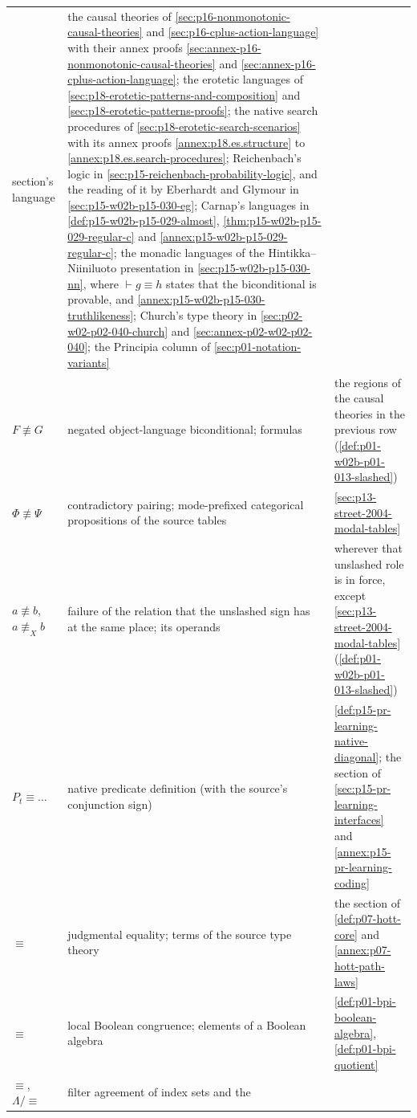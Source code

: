 \begin{longtable}{@{}p{}p{}p{}@{}}
section's language & the causal theories of
\cref{sec:p16-nonmonotonic-causal-theories} and
\cref{sec:p16-cplus-action-language} with their annex proofs
\cref{sec:annex-p16-nonmonotonic-causal-theories} and
\cref{sec:annex-p16-cplus-action-language}; the erotetic languages of
\cref{sec:p18-erotetic-patterns-and-composition} and
\cref{sec:p18-erotetic-patterns-proofs}; the native search procedures of
\cref{sec:p18-erotetic-search-scenarios} with its annex proofs
\cref{annex:p18.es.structure} to \cref{annex:p18.es.search-procedures};
Reichenbach's logic in \cref{sec:p15-reichenbach-probability-logic}, and
the reading of it by Eberhardt and Glymour in \cref{sec:p15-w02b-p15-030-eg};
Carnap's languages in \cref{def:p15-w02b-p15-029-almost},
\cref{thm:p15-w02b-p15-029-regular-c} and
\cref{annex:p15-w02b-p15-029-regular-c}; the monadic languages of the
Hintikka--Niiniluoto presentation in \cref{sec:p15-w02b-p15-030-nn}, where
\(\vdash g\equiv h\) states that the biconditional is provable, and
\cref{annex:p15-w02b-p15-030-truthlikeness};
Church's type theory in \cref{sec:p02-w02-p02-040-church} and
\cref{sec:annex-p02-w02-p02-040}; the Principia column of
\cref{sec:p01-notation-variants} \\
\(F\not\equiv G\) & negated object-language biconditional; formulas &
the regions of the causal theories in the previous row
(\cref{def:p01-w02b-p01-013-slashed}) \\
\(\Phi\not\equiv\Psi\) & contradictory pairing; mode-prefixed categorical
propositions of the source tables & \cref{sec:p13-street-2004-modal-tables} \\
\(a\not\equiv b\), \(a\not\equiv_X b\) & failure of the relation that the
unslashed sign has at the same place; its operands &
wherever that unslashed role is in force, except
\cref{sec:p13-street-2004-modal-tables}
(\cref{def:p01-w02b-p01-013-slashed}) \\
\(P_t\equiv\ldots\) & native predicate definition (with the source's
conjunction sign) & \cref{def:p15-pr-learning-native-diagonal}; the section of
\cref{sec:p15-pr-learning-interfaces} and \cref{annex:p15-pr-learning-coding} \\
\(\equiv\) & judgmental equality; terms of the source type theory & the
section of \cref{def:p07-hott-core} and \cref{annex:p07-hott-path-laws} \\
\(\equiv\) & local Boolean congruence; elements of a Boolean algebra &
\cref{def:p01-bpi-boolean-algebra}, \cref{def:p01-bpi-quotient} \\
\(\equiv\), \(\Lambda/{\equiv}\) & filter agreement of index sets and the

\end{longtable}
